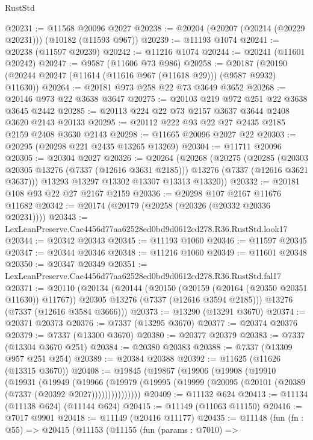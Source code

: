 \begin{lexlean}{RustStd}
\begin{coremodule}
@20231 := @11568 @20096 @2027
@20238 := @20204 (@20207 (@20214 (@20229 @20231))) (@10182 (@11593 @967))
@20239 := @11193 @1074
@20241 := @20238 (@11597 @20239)
@20242 := @11216 @1074
@20244 := @20241 (@11601 @20242)
@20247 := @9587 (@11606 @73 @986)
@20258 := @20187 (@20190 (@20244 @20247 (@11614 (@11616 @967 (@11618 @29))) (@9587 @9932) @11630))
@20264 := @20181 @973 @258 @22 @73 @3649 @3652
@20268 := @20146 @973 @22 @3638 @3647
@20275 := @20103 @219 @972 @251 @22 @3638 @3645 @2442
@20285 := @20113 @224 @22 @73 @2157 @3637 @3644 @2408 @3620 @2143 @20133
@20295 := @20112 @222 @93 @22 @27 @2435 @2185 @2159 @2408 @3630 @2143
@20298 := @11665 @20096 @2027 @22
@20303 := @20295 (@20298 @221 @2435 @13265 @13269)
@20304 := @11711 @20096
@20305 := @20304 @2027
@20326 := @20264
    (@20268
      (@20275
        (@20285
          (@20303 @20305 @13276 (@7337 (@12616 @3631 @2185)))
          @13276
          (@7337 (@12616 @3621 @3637)))
        @13293
        @13297
        @13302
        @13307
        @13313
        @13320))
@20332 := @20181 @108 @93 @22 @27 @2167 @2159
@20336 := @20298 @107 @2167 @11676 @11682
@20342 := @20174 (@20179 (@20258 (@20326 (@20332 @20336 @20231))))
@20343 := LexLeanPreserve.Cae4456d77aa62528ed0bd9d0612cd278.R36.RustStd.look17
@20344 := @20342 @20343
@20345 := @11193 @1060
@20346 := @11597 @20345
@20347 := @20344 @20346
@20348 := @11216 @1060
@20349 := @11601 @20348
@20350 := @20347 @20349
@20351 := LexLeanPreserve.Cae4456d77aa62528ed0bd9d0612cd278.R36.RustStd.fal17
@20371 := @20110
    (@20134
      (@20144
        (@20150 (@20159 (@20164 (@20350 @20351 @11630)) @11767))
        @20305
        @13276
        (@7337 (@12616 @3594 @2185)))
      @13276
      (@7337 (@12616 @3584 @3666)))
@20373 := @13290 (@13291 @3670)
@20374 := @20371 @20373
@20376 := @7337 (@13295 @3670)
@20377 := @20374 @20376
@20379 := @7337 (@13300 @3670)
@20380 := @20377 @20379
@20383 := @7337 (@13304 @3670 @251)
@20384 := @20380 @20383
@20388 := @7337 (@13309 @957 @251 @254)
@20389 := @20384 @20388
@20392 := @11625 (@11626 (@13315 @3670))
@20408 := @19845
    (@19867
      (@19906
        (@19908
          (@19910
            (@19931
              (@19949
                (@19966
                  (@19979
                    (@19995 (@19999 (@20095 (@20101 (@20389 (@7337 (@20392 @2027)))))))))))))))
@20409 := @11132 @624
@20413 := @11134 (@11138 @624) (@11144 @624)
@20415 := @11149 (@11063 @11150)
@20416 := @7017 @9901
@20418 := @11149 (@20416 @11177)
@20435 := @11148
    (fun (fn : @55) =>
    @20415
      (@11153
        (@11155
          (fun (params : @7010) =>

\end{coremodule}
\end{lexlean}
